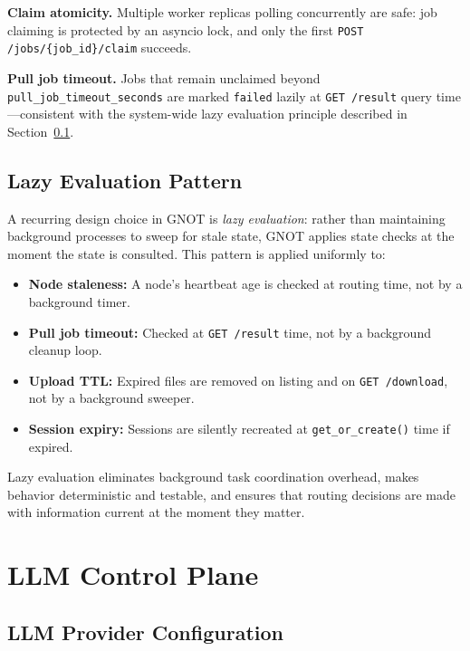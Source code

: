 \documentclass[10pt,twocolumn]{article}
\begin{document}
\textbf{Claim atomicity.} Multiple worker replicas polling concurrently
are safe: job claiming is protected by an asyncio lock, and only the
first \texttt{POST /jobs/\{job\_id\}/claim} succeeds.

\textbf{Pull job timeout.} Jobs that remain unclaimed beyond
\texttt{pull\_job\_timeout\_seconds} are marked \texttt{failed} lazily
at \texttt{GET /result} query time---consistent with the system-wide
lazy evaluation principle described in Section~\ref{sec:lazy}.

\subsection{Lazy Evaluation Pattern}
\label{sec:lazy}

A recurring design choice in GNOT is \emph{lazy evaluation}: rather than
maintaining background processes to sweep for stale state, GNOT applies
state checks at the moment the state is consulted. This pattern is
applied uniformly to:

\begin{itemize}[noitemsep, leftmargin=12pt]
  \item \textbf{Node staleness:} A node's heartbeat age is checked at
    routing time, not by a background timer.
  \item \textbf{Pull job timeout:} Checked at \texttt{GET /result} time,
    not by a background cleanup loop.
  \item \textbf{Upload TTL:} Expired files are removed on listing and on
    \texttt{GET /download}, not by a background sweeper.
  \item \textbf{Session expiry:} Sessions are silently recreated at
    \texttt{get\_or\_create()} time if expired.
\end{itemize}

Lazy evaluation eliminates background task coordination overhead, makes
behavior deterministic and testable, and ensures that routing decisions
are made with information current at the moment they matter.

\FloatBarrier
\section{LLM Control Plane}
\label{sec:agent}

\subsection{LLM Provider Configuration}
\end{document}
